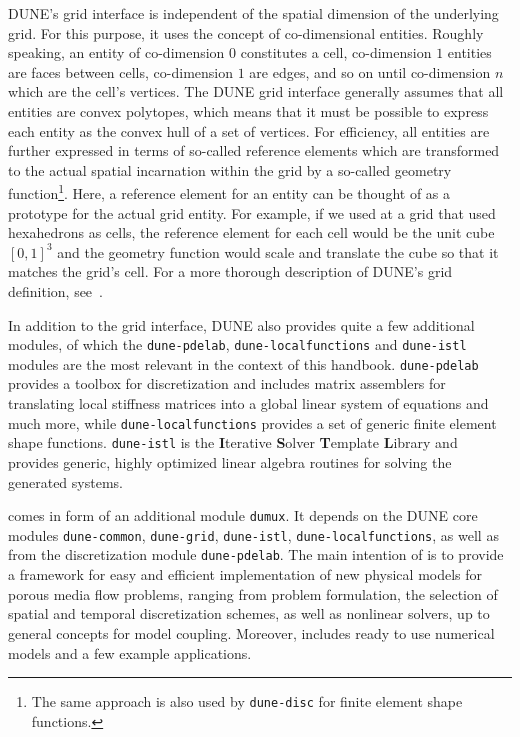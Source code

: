 DUNE's grid interface is independent of the spatial dimension of the
underlying grid. For this purpose, it uses the concept of
co-dimensional entities. Roughly speaking, an entity of co-dimension
$0$ constitutes a cell, co-dimension $1$ entities are faces between
cells, co-dimension $1$ are edges, and so on until co-dimension $n$
which are the cell's vertices.  The DUNE grid interface generally
assumes that all entities are convex polytopes, which means that it
must be possible to express each entity as the convex hull of a set of
vertices. For efficiency, all entities are further expressed in terms
of so-called reference elements which are transformed to the actual
spatial incarnation within the grid by a so-called geometry
function\footnote{The same approach is also used by \texttt{dune-disc} for
  finite element shape functions.}. Here, a reference element for an
entity can be thought of as a prototype for the actual grid
entity. For example, if we used at a grid that used hexahedrons as cells,
the reference element for each cell would be the unit cube $[0, 1]^3$
and the geometry function would scale and translate the cube so that
it matches the grid's cell. For a more thorough description of DUNE's
grid definition, see~\cite{BASTIAN2008}.

In addition to the grid interface, DUNE also provides quite a few
additional modules, of which the \texttt{dune-pdelab},
\texttt{dune-localfunctions} and \texttt{dune-istl} modules are the
most relevant in the context of this handbook.  \texttt{dune-pdelab}
provides a toolbox for discretization and includes matrix assemblers
for translating local stiffness matrices into a global linear system
of equations and much more, while \texttt{dune-localfunctions}
provides a set of generic finite element shape
functions. \texttt{dune-istl} is the \textbf{I}terative
\textbf{S}olver \textbf{T}emplate \textbf{L}ibrary and provides
generic, highly optimized linear algebra routines for solving the
generated systems.

\Dumux comes in form of an additional module \texttt{dumux}. 
It depends on the DUNE core modules 
\texttt{dune-common}, \texttt{dune-grid}, \texttt{dune-istl}, \texttt{dune-localfunctions}, as well as from 
the discretization module \texttt{dune-pdelab}. 
The main intention of \Dumux is to provide a framework for easy and efficient 
implementation of new physical models for porous media flow problems, 
ranging from problem formulation, the selection of 
spatial and temporal discretization schemes, as well as nonlinear solvers,  
up to general concepts for model coupling.  
Moreover, \Dumux includes ready to use numerical models and a few example applications. 

